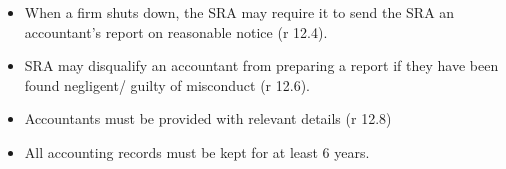 \documentclass[
]{article}
\providecommand{\tightlist}{%
  \setlength{\itemsep}{0pt}\setlength{\parskip}{0pt}}
\begin{document}
\begin{itemize}
\tightlist
\item
  When a firm shuts down, the SRA may require it to send the SRA an
  accountant's report on reasonable notice (r 12.4).
\item
  SRA may disqualify an accountant from preparing a report if they have
  been found negligent/ guilty of misconduct (r 12.6).
\item
  Accountants must be provided with relevant details (r 12.8)
\item
  All accounting records must be kept for at least 6 years.
\end{itemize}
\end{document}

